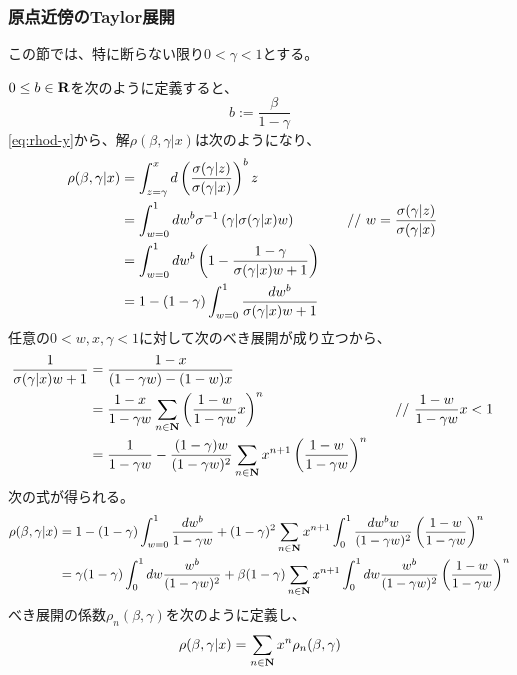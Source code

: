 \subsubsection{原点近傍のTaylor展開}\label{s3:原点近傍のTaylor展開} %
この節では、特に断らない限り$0<\gamma<1$とする。

$0\le b\in\mathbf{R}$を次のように定義すると、
\begin{equation*}
	b := \frac{\beta}{1 - \gamma}
\end{equation*}
\eqref{eq:rhod-y}から、解$\rho(\beta,\gamma|x)$は次のようになり、
\begin{alignat*}{2}
	\rho(\beta,\gamma|x) &= \int_{z=\gamma}^x 
		d\mathinner{\left({\frac{\sigma(\gamma|z)}{\sigma(\gamma|x)}}\right)}^b z \\
	&= \int_{w=0}^1 dw^b\sigma^{-1}\mathinner{\left({\gamma|\sigma(\gamma|x)w}\right)}
	&\quad&\text{// } w = \frac{\sigma(\gamma|z)}{\sigma(\gamma|x)} \\
	&= \int_{w=0}^1 dw^b
		\mathinner{\left({1 - \frac{1 - \gamma}{\sigma(\gamma|x)w + 1}}\right)} \\
	&= 1 - (1 - \gamma)\int_{w=0}^1 \frac{dw^b}{\sigma(\gamma|x)w + 1}
\end{alignat*}
任意の$0<w,x,\gamma<1$に対して次のべき展開が成り立つから、
\begin{alignat*}{2}
	\frac{1}{\sigma(\gamma|x)w + 1} 
	&= \frac{1 - x}{(1 - \gamma w) - (1 - w)x} \\
	&= \frac{1 - x}{1 - \gamma w}\sum_{n\in\mathbf{N}}
		\mathinner{\left({\frac{1 - w}{1 - \gamma w}x}\right)}^n 
	&\quad&\text{// } \frac{1 - w} {1 - \gamma w} x < 1 \\
	&= \frac{1}{1 - \gamma w}
		- \frac{(1 - \gamma)w}{(1 - \gamma w)^2}\sum_{n\in\mathbf{N}} x^{n + 1}
		\mathinner{\left({\frac{1 - w}{1 - \gamma w}}\right)}^n
\end{alignat*}
次の式が得られる。
\begin{equation*}\begin{split}
	\rho(\beta,\gamma|x) 
	&= 1 - (1 - \gamma)\int_{w=0}^1 \frac{dw^b}{1 - \gamma w}
		+ (1 - \gamma)^2\sum_{n\in\mathbf{N}} x^{n + 1} \int_0^1 
		\frac{dw^b w}{(1 - \gamma w)^2}\mathinner{\left({\frac{1 - w}{1 - \gamma w}}\right)}^n \\
	&= \gamma(1 - \gamma)\int_0^1 dw \frac{w^b}{(1 - \gamma w)^2}
		+ \beta(1 - \gamma)\sum_{n\in\mathbf{N}}x^{n + 1}\int_0^1 dw 
		\frac{w^b}{(1 - \gamma w)^2} \mathinner{\left({\frac{1 - w}{1 - \gamma w}}\right)}^n \\
\end{split}\end{equation*}
べき展開の係数$\rho_n(\beta,\gamma)$を次のように定義し、
\begin{equation*}
	\rho(\beta,\gamma|x) = \sum_{n\in\mathbf{N}}x^n\rho_n(\beta,\gamma)
\end{equation*}
